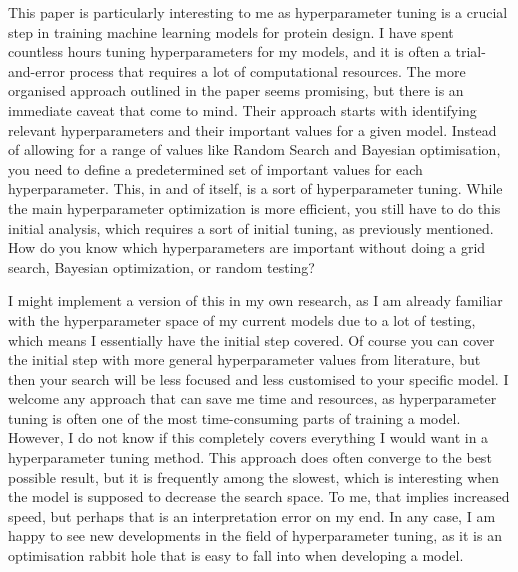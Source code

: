 \documentclass[a4paper, 11pt]{article} %
\begin{document}
This paper is particularly interesting to me as hyperparameter tuning is a crucial step in training machine learning models for protein design. I have spent countless hours tuning hyperparameters for my models, and it is often a trial-and-error process that requires a lot of computational resources. The more organised approach outlined in the paper seems promising, but there is an immediate caveat that come to mind. Their approach starts with identifying relevant hyperparameters and their important values for a given model. Instead of allowing for a range of values like Random Search and Bayesian optimisation, you need to define a predetermined set of important values for each hyperparameter. This, in and of itself, is a sort of hyperparameter tuning. While the main hyperparameter optimization is more efficient, you still have to do this initial analysis, which requires a sort of initial tuning, as previously mentioned. How do you know which hyperparameters are important without doing a grid search, Bayesian optimization, or random testing?

I might implement a version of this in my own research, as I am already familiar with the hyperparameter space of my current models due to a lot of testing, which means I essentially have the initial step covered. Of course you can cover the initial step with more general hyperparameter values from literature, but then your search will be less focused and less customised to your specific model. I welcome any approach that can save me time and resources, as hyperparameter tuning is often one of the most time-consuming parts of training a model. However, I do not know if this completely covers everything I would want in a hyperparameter tuning method. This approach does often converge to the best possible result, but it is frequently among the slowest, which is interesting when the model is supposed to decrease the search space. To me, that implies increased speed, but perhaps that is an interpretation error on my end. In any case, I am happy to see new developments in the field of hyperparameter tuning, as it is an optimisation rabbit hole that is easy to fall into when developing a model.



\newpage
\printbibliography

\end{document}
